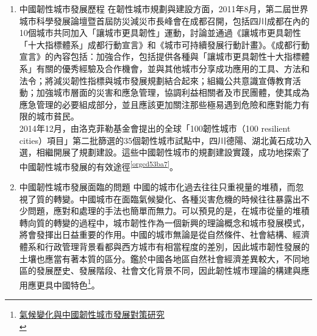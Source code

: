 \documentclass[a4paper,12pt]{article}
\begin{document}
\begin{enumerate}
\item 中國韌性城市發展歷程
\label{sec:org7a0c438}
在韌性城市規劃與建設方面，2011年8月，第二屆世界城市科學發展論壇暨首屆防災減災市長峰會在成都召開，包括四川成都在內的10個城市共同加入「讓城市更具韌性」運動，討論並通過《讓城市更具韌性「十大指標體系」成都行動宣言》和《城市可持續發展行動計畫》。《成都行動宣言》的內容包括：加強合作，包括提供各種與「讓城市更具韌性十大指標體系」有關的優秀經驗及合作機會，並與其他城市分享成功應用的工具、方法和法令；將減災韌性指標與城市發展規劃結合起來；組織公共意識宣傳教育活動；加強城市層面的災害和應急管理，協調利益相關者及市民團體，使其成為應急管理的必要組成部分，並且應該更加關注那些極易遇到危險和應對能力有限的城市貧民。\\

2014年12月，由洛克菲勒基金會提出的全球「100韌性城市（100 resilient cities）項目」第二批篩選的35個韌性城市試點中，四川德陽、湖北黃石成功入選，相繼開展了規劃建設。這些中國韌性城市的規劃建設實踐，成功地探索了中國韌性城市發展的有效途徑\textsuperscript{\ref{orgcd53ba7}}。\\

\item 中國韌性城市發展面臨的問題
\label{sec:org576f204}
中國的城市化過去往往只重視量的堆積，而忽視了質的轉變。中國城市在面臨氣候變化、各種災害危機的時候往往暴露出不少問題，應對和處理的手法也簡單而無力。可以預見的是，在城市從量的堆積轉向質的轉變的過程中，城市韌性作為一個新興的理論概念和城市發展模式，將會發揮出日益重要的作用。中國的城市無論是從自然條件、社會結構、經濟體系和行政管理背景看都與西方城市有相當程度的差別，因此城市韌性發展的土壤也應當有著本質的區分。鑑於中國各地區自然社會經濟差異較大，不同地區的發展歷史、發展階段、社會文化背景不同，因此韌性城市理論的構建與應用應更具中國特色\footnote{\href{https://www.sanmin.com.tw/Product/Index/006005940}{氣候變化與中國韌性城市發展對策研究}\\}。\\


\end{enumerate}
\end{document}
